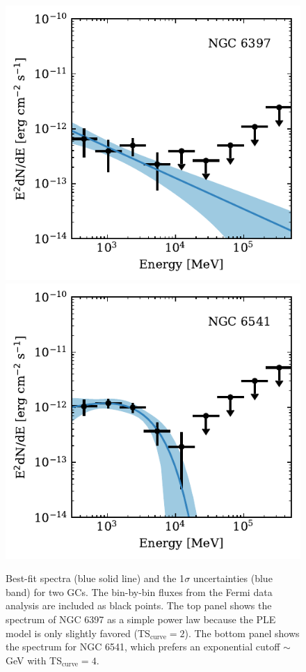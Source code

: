 \documentclass[doublespace,draft,nopageskip]{VTthesis} %
\begin{document}
\begin{figure}
    \centering
    \includegraphics[width=1\columnwidth]{Figures/Globular/spectra/PL_spectrum_16.pdf}
    \includegraphics[width=1\columnwidth]{Figures/Globular/spectra/PLE_spectrum_21.pdf}
    \caption{Best-fit spectra (blue solid line) and the 1$\sigma$ uncertainties (blue band) for two GCs. The bin-by-bin fluxes from the Fermi data analysis are included as black points. The top panel shows the spectrum of NGC 6397 as a simple power law because the PLE model is only slightly favored (TS$_\mathrm{curve} = 2$). The bottom panel shows the spectrum for NGC 6541, which prefers an exponential cutoff $\sim$ GeV with TS$_\mathrm{curve} = 4$.}
    \label{fig:spectra_example}
\end{figure}
\end{document}
